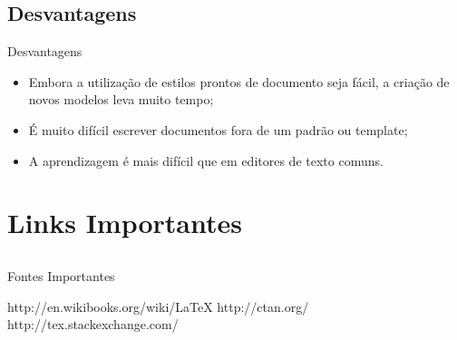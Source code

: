 \subsection{Desvantagens}

\begin{frame}{Desvantagens}
\begin{itemize}
    \item Embora a utilização de estilos prontos de documento seja fácil, a criação de novos modelos leva muito tempo;
    \item É muito difícil escrever documentos fora de um padrão ou template;
    \item A aprendizagem é mais difícil que em editores de texto comuns.
\end{itemize}
\end{frame}

\section{Links Importantes}
\subsection{}
\begin{frame}{Fontes Importantes}
  \begin{thebibliography}{10}
  \beamertemplatearticlebibitems
    http://en.wikibooks.org/wiki/LaTeX
    \newblock \href{http://en.wikibooks.org/wiki/LaTeX}{}
    http://ctan.org/
    \newblock \href{http://ctan.org/}{}
    http://tex.stackexchange.com/
    \newblock \href{http://tex.stackexchange.com/}{}
  \end{thebibliography}
\end{frame}

% 
